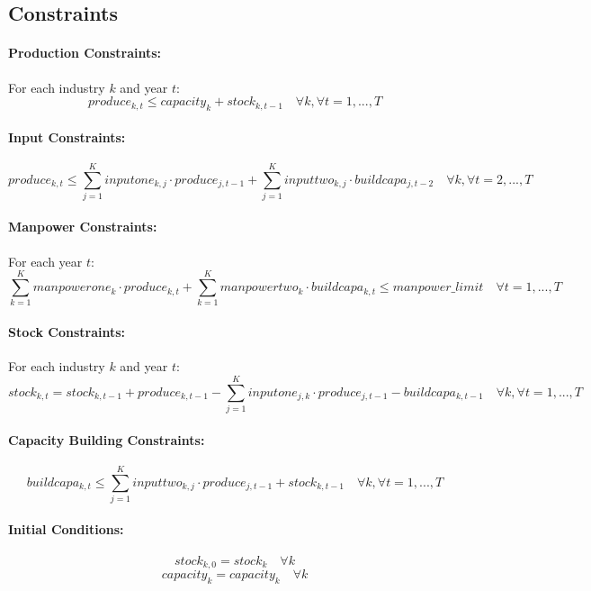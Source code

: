 \documentclass{article}
\begin{document}
\subsection*{Constraints}

\paragraph{Production Constraints:}
For each industry $k$ and year $t$:
\[
produce_{k, t} \leq capacity_{k} + stock_{k, t-1} \quad \forall k, \forall t = 1,...,T
\]

\paragraph{Input Constraints:}
\[
produce_{k, t} \leq \sum_{j=1}^{K} inputone_{k, j} \cdot produce_{j, t-1} + \sum_{j=1}^{K} inputtwo_{k, j} \cdot buildcapa_{j, t-2} \quad \forall k, \forall t = 2,...,T
\]

\paragraph{Manpower Constraints:}
For each year $t$:
\[
\sum_{k=1}^{K} manpowerone_{k} \cdot produce_{k, t} + \sum_{k=1}^{K} manpowertwo_{k} \cdot buildcapa_{k, t} \leq manpower\_limit \quad \forall t = 1,...,T
\]

\paragraph{Stock Constraints:}
For each industry $k$ and year $t$:
\[
stock_{k, t} = stock_{k, t-1} + produce_{k, t-1} - \sum_{j=1}^{K} inputone_{j, k} \cdot produce_{j, t-1} - buildcapa_{k, t-1} \quad \forall k, \forall t = 1,...,T
\]

\paragraph{Capacity Building Constraints:}
\[
buildcapa_{k, t} \leq \sum_{j=1}^{K} inputtwo_{k, j} \cdot produce_{j, t-1} + stock_{k, t-1} \quad \forall k, \forall t = 1,...,T
\]

\paragraph{Initial Conditions:}
\[
stock_{k, 0} = stock_{k} \quad \forall k
\]
\[
capacity_{k} = capacity_{k} \quad \forall k
\]
\end{document}
